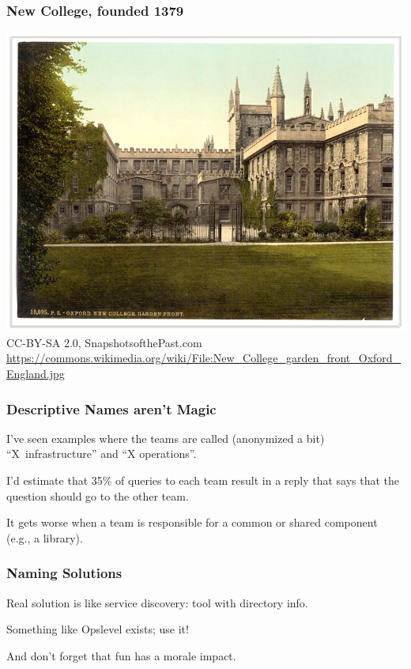 \begin{frame}[fragile]
\frametitle{New College, founded 1379}

\begin{center}
\includegraphics[width=.8\textwidth]{images/New_College_garden_front_Oxford_England.jpg}\\
CC-BY-SA 2.0, SnapshotsofthePast.com\\
\tiny \url{https://commons.wikimedia.org/wiki/File:New_College_garden_front_Oxford_England.jpg}
\end{center}
\end{frame}

\begin{frame}
\frametitle{Descriptive Names aren't Magic}

I've seen examples where the teams are called (anonymized a bit) ``X~infrastructure'' and ``X operations''.

I'd estimate that 35\% of queries to each team result in a reply that says that the question should go to the other team. 

It gets worse when a team is responsible for a common or shared component (e.g., a library). 

\end{frame}


\begin{frame}
\frametitle{Naming Solutions}

Real solution is like service discovery: tool with directory info.

Something like Opslevel exists; use it!

And don't forget that fun has a morale impact. 

\end{frame}

